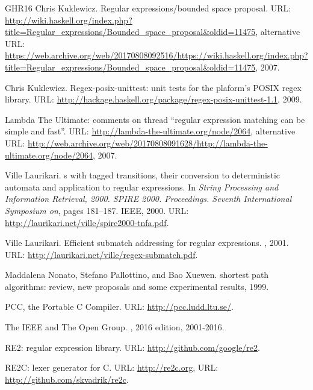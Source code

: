\documentclass{article}
\theoremstyle{definition}
\begin{document}
\begin{thebibliography}{GHR{\etalchar{+}}16}
Chris Kuklewicz.
\newblock Regular expressions/bounded space proposal.
\newblock URL:
  \url{http://wiki.haskell.org/index.php?title=Regular_expressions/Bounded_space_proposal&oldid=11475},
  alternative URL:
  \url{https://web.archive.org/web/20170808092516/https://wiki.haskell.org/index.php?title=Regular_expressions/Bounded_space_proposal&oldid=11475},
  2007.

Chris Kuklewicz.
\newblock Regex-posix-unittest: unit tests for the plaform's {POSIX} regex
  library.
\newblock URL:
  \url{http://hackage.haskell.org/package/regex-posix-unittest-1.1}, 2009.

{Lambda The Ultimate}: comments on thread ``regular expression matching can be
  simple and fast''.
\newblock URL: \url{http://lambda-the-ultimate.org/node/2064}, alternative URL:
  \url{http://web.archive.org/web/20170808091628/http://lambda-the-ultimate.org/node/2064},
  2007.

Ville Laurikari.
s with tagged transitions, their conversion to deterministic
  automata and application to regular expressions.
\newblock In {\em String Processing and Information Retrieval, 2000. SPIRE
  2000. Proceedings. Seventh International Symposium on}, pages 181--187. IEEE,
  2000.
\newblock URL: \url{http://laurikari.net/ville/spire2000-tnfa.pdf}.

Ville Laurikari.
\newblock Efficient submatch addressing for regular expressions.
, 2001.
\newblock URL: \url{http://laurikari.net/ville/regex-submatch.pdf}.

Maddalena Nonato, Stefano Pallottino, and Bao Xuewen.
 shortest path algorithms: review, new proposals and some
  experimental results, 1999.

{PCC}, the {P}ortable {C} {C}ompiler.
\newblock URL: \url{http://pcc.ludd.ltu.se/}.

The IEEE and The Open Group.
, 2016 edition,
  2001-2016.

{RE2}: regular expression library.
\newblock URL: \url{http://github.com/google/re2}.

{RE2C}: lexer generator for {C}.
\newblock URL: \url{http://re2c.org}, URL:
  \url{http://github.com/skvadrik/re2c}.


\end{thebibliography}
\end{document}

